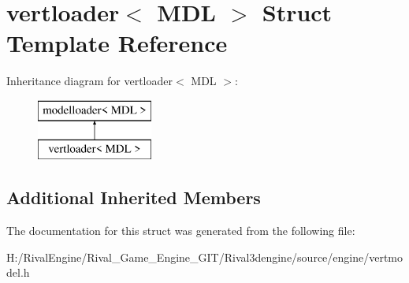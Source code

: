 \hypertarget{structvertloader}{}\section{vertloader$<$ M\+DL $>$ Struct Template Reference}
\label{structvertloader}
Inheritance diagram for vertloader$<$ M\+DL $>$\+:\begin{figure}[H]
\begin{center}
\leavevmode
\includegraphics[height=2.000000cm]{structvertloader}
\end{center}
\end{figure}
\subsection*{Additional Inherited Members}


The documentation for this struct was generated from the following file\+:\begin{DoxyCompactItemize}
\item 
H\+:/\+Rival\+Engine/\+Rival\+\_\+\+Game\+\_\+\+Engine\+\_\+\+G\+I\+T/\+Rival3dengine/source/engine/vertmodel.\+h\end{DoxyCompactItemize}
